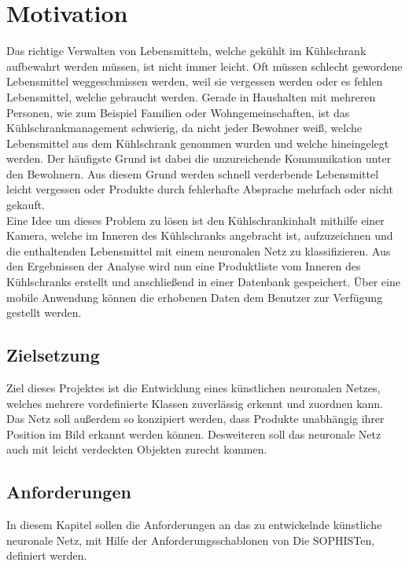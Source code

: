 \documentclass[a4paper,12pt,oneside]{article}
\begin{document}
  \newpage
  
  \tableofcontents
  \newpage
  \listoffigures
 
  
  \newpage
  \pagestyle{plain}
  \setcounter{page}{1}
   
  
  \section{Motivation}
Das richtige Verwalten von Lebensmitteln, welche gekühlt im Kühlschrank aufbewahrt werden müssen, ist nicht immer leicht. Oft müssen schlecht gewordene Lebensmittel weggeschmissen werden, weil sie vergessen werden oder es fehlen Lebensmittel, welche gebraucht werden. Gerade in Haushalten mit mehreren Personen, wie zum Beispiel Familien oder Wohngemeinschaften, ist das Kühlschrankmanagement schwierig, da nicht jeder Bewohner weiß, welche Lebensmittel aus dem Kühlschrank genommen wurden und welche hineingelegt werden. Der häufigste Grund ist dabei die unzureichende Kommunikation unter den Bewohnern. Aus diesem Grund werden schnell verderbende Lebensmittel leicht vergessen oder Produkte durch fehlerhafte Absprache mehrfach oder nicht gekauft. \\ Eine Idee um dieses Problem zu lösen ist den Kühlschrankinhalt mithilfe einer Kamera, welche im Inneren des Kühlschranks angebracht ist, aufzuzeichnen und die enthaltenden Lebensmittel mit einem neuronalen Netz zu klassifizieren. Aus den Ergebnissen der Analyse wird nun eine Produktliste vom Inneren des Kühlschranks erstellt und anschließend in einer Datenbank gespeichert. Über eine mobile Anwendung können die erhobenen Daten dem Benutzer zur Verfügung gestellt werden.
  
  \subsection{Zielsetzung} 
Ziel dieses Projektes ist die Entwicklung eines künstlichen neuronalen Netzes, welches mehrere vordefinierte Klassen zuverlässig erkennt und zuordnen kann. Das Netz soll außerdem so konzipiert werden, dass Produkte unabhängig ihrer Position im Bild erkannt werden können. Desweiteren soll das neuronale Netz auch mit leicht verdeckten Objekten zurecht kommen.

\newpage
	
  \subsection{Anforderungen}
In diesem Kapitel sollen die Anforderungen an das zu entwickelnde künstliche neuronale Netz, mit Hilfe der Anforderungsschablonen von \glqq Die SOPHISTen\grqq \cite{sophisten2013schablonen}, definiert werden. 
  
\end{document}
